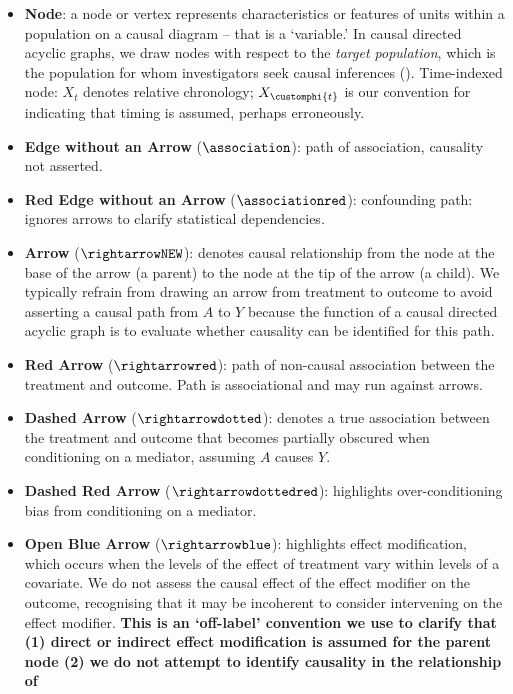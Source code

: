 \documentclass[
  single column]{article}
\begin{document}
\begin{itemize}
\item
  \textbf{Node}: a node or vertex represents characteristics or features
  of units within a population on a causal diagram -- that is a
  `variable.' In causal directed acyclic graphs, we draw nodes with
  respect to the \emph{target population}, which is the population for
  whom investigators seek causal inferences
  (). Time-indexed
  node: \(X_t\) denotes relative chronology; \(X_{\customphi{t}}\) is
  our convention for indicating that timing is assumed, perhaps
  erroneously.
\item
  \textbf{Edge without an Arrow} (\(\association\)): path of
  association, causality not asserted.
\item
  \textbf{Red Edge without an Arrow} (\(\associationred\)): confounding
  path: ignores arrows to clarify statistical dependencies.
\item
  \textbf{Arrow} (\(\rightarrowNEW\)): denotes causal relationship from
  the node at the base of the arrow (a parent) to the node at the tip of
  the arrow (a child). We typically refrain from drawing an arrow from
  treatment to outcome to avoid asserting a causal path from \(A\) to
  \(Y\) because the function of a causal directed acyclic graph is to
  evaluate whether causality can be identified for this path.
\item
  \textbf{Red Arrow} (\(\rightarrowred\)): path of non-causal
  association between the treatment and outcome. Path is associational
  and may run against arrows.
\item
  \textbf{Dashed Arrow} (\(\rightarrowdotted\)): denotes a true
  association between the treatment and outcome that becomes partially
  obscured when conditioning on a mediator, assuming \(A\) causes \(Y\).
\item
  \textbf{Dashed Red Arrow} (\(\rightarrowdottedred\)): highlights
  over-conditioning bias from conditioning on a mediator.
\item
  \textbf{Open Blue Arrow} (\(\rightarrowblue\)): highlights effect
  modification, which occurs when the levels of the effect of treatment
  vary within levels of a covariate. We do not assess the causal effect
  of the effect modifier on the outcome, recognising that it may be
  incoherent to consider intervening on the effect modifier.
  \textbf{This is an `off-label' convention we use to clarify that (1)
  direct or indirect effect modification is assumed for the parent node
  (2) we do not attempt to identify causality in the relationship of
}
\end{itemize}
\end{document}
